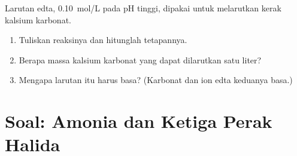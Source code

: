 \begin{exercise}[$\star\star\star$]\label{exo:b1:complexation:12}
Larutan edta, \qty{0.10}{mol/L}  pada pH tinggi, dipakai untuk
melarutkan kerak kalsium karbonat.
\begin{enumerate}
  \item Tuliskan reaksinya dan hitunglah tetapannya.
  \item Berapa massa kalsium karbonat yang dapat dilarutkan satu liter?
  \item Mengapa larutan itu harus basa? (Karbonat dan ion edta
        keduanya basa.)
\end{enumerate}
\end{exercise}

\section{Soal: Amonia dan Ketiga Perak Halida}

